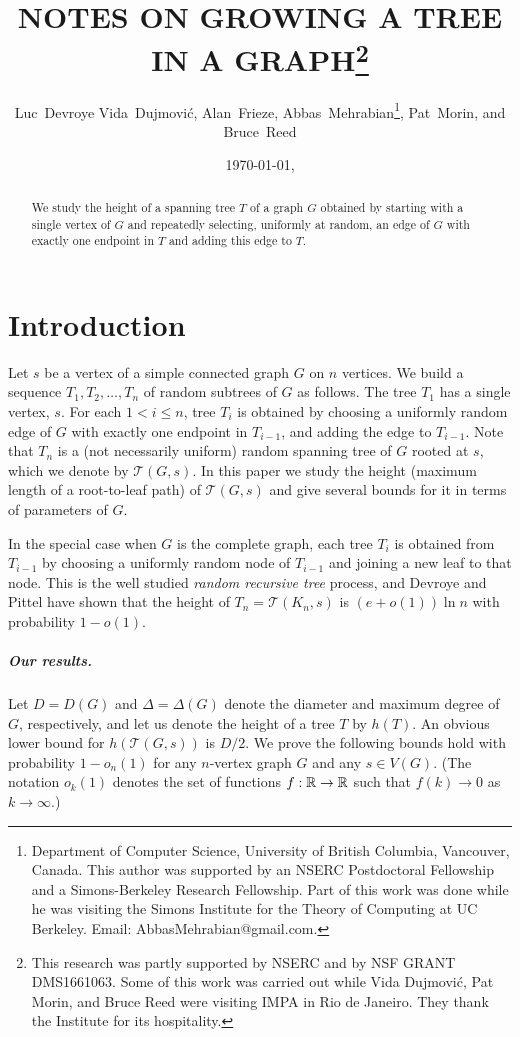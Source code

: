 \documentclass{patmorin}
\date{\today, \currenttime}
\title{\MakeUppercase{Notes on Growing a Tree in a Graph}\thanks{%
This research was partly supported by NSERC and by NSF GRANT DMS1661063.
Some of this work was carried out while Vida Dujmovi\'c, Pat Morin, and
Bruce Reed were visiting IMPA in Rio de Janeiro. They thank the Institute
for its hospitality. }}
\author{
   Luc~Devroye
   Vida~Dujmovi\'c,
   Alan~Frieze,
   Abbas~Mehrabian\thanks{Department of Computer Science, University of British Columbia, Vancouver, Canada. 
   This author was
       supported by an NSERC Postdoctoral Fellowship and a Simons-Berkeley
       Research Fellowship. Part of this work was done while he was
       visiting the Simons Institute for the Theory of Computing at UC
       Berkeley. Email: AbbasMehrabian@gmail.com.},
   Pat~Morin, and
   Bruce~Reed
}
\newcommand{\tcal}{\mathcal{T}}
\begin{document}
\maketitle

\begin{abstract}
We study the height of a spanning tree $T$ of a graph $G$ obtained by
starting with a single vertex of $G$ and repeatedly selecting, uniformly
at random, an edge of $G$ with exactly one endpoint in $T$ and adding
this edge to $T$.
\end{abstract}

\newpage 
\tableofcontents
\newpage

\section{Introduction}
Let $s$ be a vertex of a simple connected graph $G$ on $n$ vertices.
We build a sequence $T_1,T_2,\dots,T_n$ of random subtrees of $G$ as follows.
The tree $T_1$ has a single vertex, $s$.
For each $1<i\leq n$, tree $T_i$ is obtained by choosing
a uniformly random edge of $G$ with exactly one endpoint in $T_{i-1}$,
and adding the edge to $T_{i-1}$.
Note that $T_n$ is a (not necessarily uniform) random spanning tree of $G$ rooted at $s$, which we denote by $\tcal(G,s)$.
In this paper we study the height (maximum length of a root-to-leaf path) of $\tcal(G,s)$ and give several bounds for it in terms of parameters of $G$.

In the special case when $G$ is the complete graph, 
each tree $T_i$ is obtained from $T_{i-1}$ by choosing a uniformly random node of $T_{i-1}$ and joining a new leaf to that node.
This is the well studied \emph{random recursive tree} process,
and 
Devroye \cite{devroye:branching} and Pittel \cite{pittel:note} have
shown that the height of $T_n=\tcal(K_n,s)$ is
$(e+o(1))\ln n$ with probability $1-o(1)$.


\subparagraph{Our results.}
Let $D=D(G)$ and $\Delta=\Delta(G)$ denote the diameter and maximum degree of $G$, respectively, and let us denote 
the height of a tree $T$ by $h(T)$.
An obvious lower bound for $h(\tcal(G,s))$ is $D/2$.
We prove the following bounds hold with probability $1-o_n(1)$ for any $n$-vertex graph $G$ and any $s\in V(G)$.
(The notation $o_k(1)$ denotes the set of functions $f:\mathbb{R}\to\mathbb{R}$ such
that $f(k)\to 0$ as $k\to\infty$.)
\end{document}
